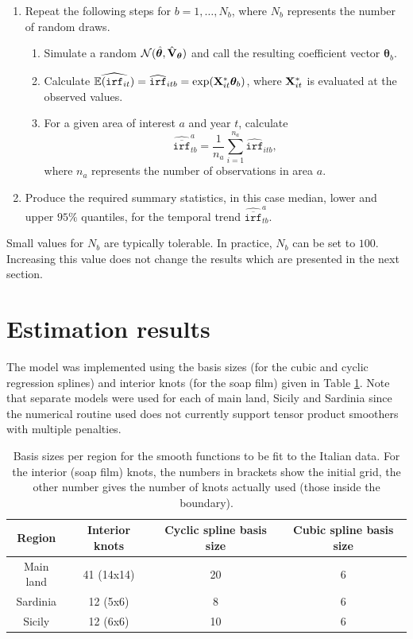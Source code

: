 \documentclass[12pt]{article}
\newcommand{\E}{\mathbb{E}}
\newcommand{\X}{{\bf X}}
\theoremstyle{definition}
\theoremstyle{plain}
\begin{document}
\begin{enumerate}
	\item Repeat the following steps for $b=1,\ldots,N_b$, where $N_b$ represents the number of random draws. 
	   \begin{enumerate}
	      \item Simulate a random $\mathcal{N}(\hat{\bm\theta}, \hat{{\bf V}}_{\bm\theta} )$ and call the resulting coefficient vector $\bm\theta_b$.
	      \item Calculate $\widehat{\E(\texttt{irf}_{it})}=\widehat{\texttt{irf}}_{itb}=\exp(\X^*_{it}\bm\theta_b)$, where $\X^*_{it}$ is evaluated at the observed values. 
	      \item For a given area of interest $a$ and year $t$, calculate
	      $$\widehat{\overline{\texttt{irf}}}_{tb}^a=\frac{1}{n_a}\sum_{i=1}^{n_a} \widehat{\texttt{irf}}_{itb},$$
	      where $n_a$ represents the number of observations in area $a$.     
	   \end{enumerate}
	\item Produce the required summary statistics, in this case median, lower and upper $95\%$ quantiles, for the temporal trend $\widehat{\overline{\texttt{irf}}}_{tb}^a$.
\end{enumerate}
Small values for $N_b$ are typically tolerable. In practice, $N_b$ can be set to $100$. Increasing this value does not change the results which are presented in the next section.
 

\section{Estimation results \label{ER}}

The model was implemented using the basis sizes (for the cubic and cyclic regression splines) and interior knots (for the soap film) given in Table \ref{soap-basis-table}. Note that separate models were used for each of main land, Sicily and Sardinia since the numerical routine used does not currently support tensor product smoothers with multiple penalties. 

\begin{table}[htbp]
\centering
\begin{tabular}{c c c c}\\
\hline
\hline
Region & Interior knots & Cyclic spline basis size & Cubic spline basis size\\
\hline
Main land & 41 (14x14) & 20 & 6\\
Sardinia & 12 (5x6) & 8 & 6\\
Sicily & 12 (6x6) & 10 & 6\\
\hline
\hline
\end{tabular}
\caption{Basis sizes per region for the smooth functions to be fit to the Italian data. For the interior (soap film) knots, the numbers in brackets show the initial grid, the other number gives the number of knots actually used (those inside the boundary).}
\label{soap-basis-table}
\end{table}
\end{document}
